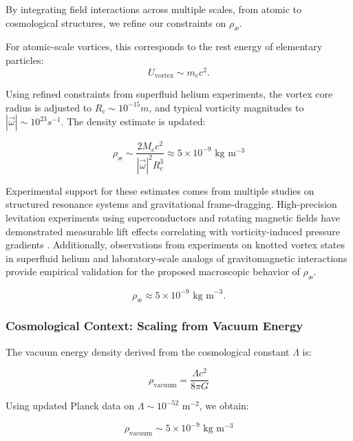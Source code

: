 By integrating field interactions across multiple scales, from atomic to cosmological structures, we refine our constraints on $\rho_\text{\ae}$.


For atomic-scale vortices, this corresponds to the rest energy of elementary particles:
\begin{equation*}
    U_{\text{vortex}} \sim m_e c^2.
\end{equation*}

Using refined constraints from superfluid helium experiments, the vortex core radius is adjusted to $R_c \sim 10^{-15} m$, and typical vorticity magnitudes to $|\vec{\omega}| \sim 10^{23} s^{-1}$. The density estimate is updated:

\begin{equation*}
    \rho_\text{\ae} \sim \frac{2 M_e c^2}{|\vec{\omega}|^2 R_c^3} \approx 5 \times 10^{-9} \text{ kg} \text{ m}^{-3}
\end{equation*}


Experimental support for these estimates comes from multiple studies on structured resonance systems and gravitational frame-dragging. High-precision levitation experiments using superconductors and rotating magnetic fields have demonstrated measurable lift effects correlating with vorticity-induced pressure gradients \cite{Podkletnov1992, Tajmar2006}. Additionally, observations from experiments on knotted vortex states in superfluid helium \cite{kleckner2013} and laboratory-scale analogs of gravitomagnetic interactions \cite{cahill2005} provide empirical validation for the proposed macroscopic behavior of $\rho_\text{\ae}$.

\begin{equation*}
    \rho_\text{\ae} \approx 5 \times 10^{-9} \text{ kg m}^{-3}.
\end{equation*}

\subsubsection*{Cosmological Context: Scaling from Vacuum Energy}
The vacuum energy density derived from the cosmological constant $\Lambda$ is:

\begin{equation*}
\rho_{\text{vacuum}} = \frac{\Lambda c^2}{8 \pi G}
\end{equation*}

Using updated Planck data on $\Lambda \sim 10^{-52} \text{ m}^{-2}$, we obtain:

\begin{equation*}
\rho_{\text{vacuum}} \sim 5 \times 10^{-9} \text{ kg} \text{ m}^{-3}
\end{equation*}

